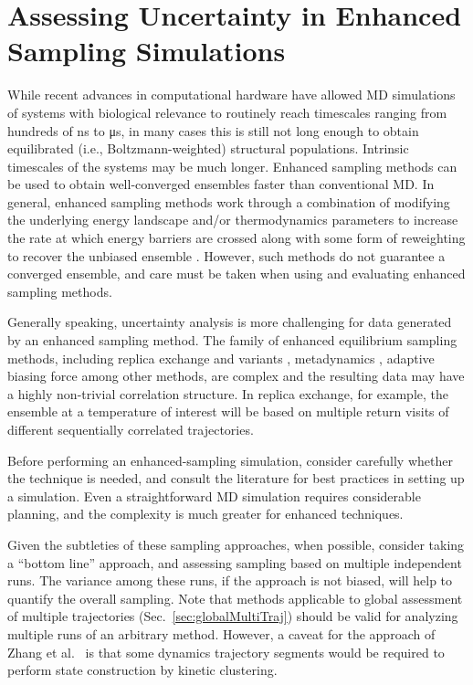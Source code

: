 \section{Assessing Uncertainty in Enhanced Sampling Simulations}
\label{sec:enhanced}

While recent advances in computational hardware have allowed MD simulations of systems with biological relevance to routinely reach timescales ranging from hundreds of \si{\nano\second} to \si{\micro\second}, in many cases this is still not long enough to obtain equilibrated (i.e., Boltzmann-weighted) structural populations.  Intrinsic timescales of the systems may be much longer.
Enhanced sampling methods can be used to obtain well-converged ensembles faster than conventional MD. In general, enhanced sampling methods work through a combination of modifying the underlying energy landscape and/or thermodynamics parameters to increase the rate at which energy barriers are crossed along with some form of reweighting to recover the unbiased ensemble \cite{Zuckerman2011}. However, such methods do not guarantee a converged ensemble, and care must be taken when using and evaluating enhanced sampling methods.

Generally speaking, uncertainty analysis is more challenging for data generated by an enhanced sampling method.
The family of enhanced equilibrium sampling methods, including replica exchange and variants \cite{Swendsen-1986,Sugita1999,Okamoto-2000}, metadynamics \cite{Bussi2006a,Laio2008}, adaptive biasing force \cite{Darve2001,Darve2008,Comer2015} among other methods, are complex and the resulting data may have a highly non-trivial correlation structure.
In replica exchange, for example, the ensemble at a temperature of interest will be based on multiple return visits of different sequentially correlated trajectories.

Before performing an enhanced-sampling simulation, consider carefully whether the technique is needed, and consult the literature for best practices in setting up a simulation.
Even a straightforward MD simulation requires considerable planning, and the complexity is much greater for enhanced techniques.

Given the subtleties of these sampling approaches, when possible, consider taking a ``bottom line'' approach, and assessing sampling based on multiple independent runs.
The variance among these runs, if the approach is not biased, will help to quantify the overall sampling.
Note that methods applicable to global assessment of multiple trajectories (Sec.\ \ref{sec:globalMultiTraj}) should be valid for analyzing multiple runs of an arbitrary method.
However, a caveat for the approach of Zhang et al.\ \cite{Zhang2010} is that some dynamics trajectory segments would be required to perform state construction by kinetic clustering.

